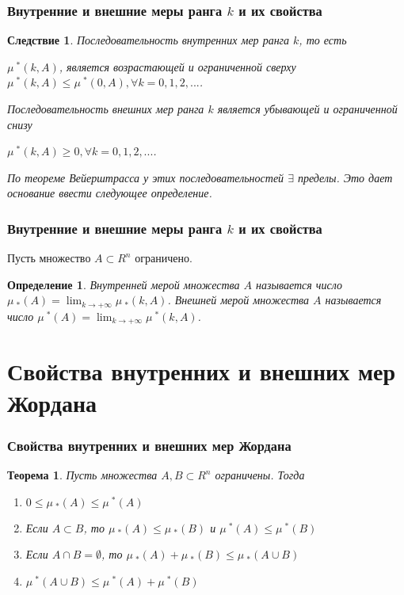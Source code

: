 \documentclass{beamer}
\newtheorem{ru_theo}{Теорема}
\renewenvironment{theorem}{\begin{ru_theo}}{\end{ru_theo}}
\newtheorem{ru_cor}{Следствие}
\renewenvironment{corollary}{\begin{ru_cor}}{\end{ru_cor}}
\newtheorem{ru_def}{Определение}
\renewenvironment{definition}{\begin{ru_def}}{\end{ru_def}}
\begin{document}
\begin{frame}
\frametitle{Внутренние и внешние меры ранга $k$ и их свойства}
	\begin{corollary}
	Последовательность внутренних мер ранга $k$, то есть
	\begin{center} 
	$\mu\ ^* (k, A)$, является возрастающей и ограниченной сверху  $\mu\ ^* (k, A) \leq \mu\ ^*(0, A), \forall k = 0, 1, 2, ...$.
	\end{center}
	 Последовательность внешних мер ранга $k$ является убывающей и ограниченной снизу 
	\begin{center}$\mu\ ^*(k, A) \geq 0, \forall k = 0, 1, 2, ...$.
	\end{center} 
	По теореме Вейерштрасса у этих последовательностей $\exists$  пределы. Это дает основание ввести следующее определение.
	\end{corollary}
\end{frame}

\begin{frame}
\frametitle{Внутренние и внешние меры ранга $k$ и их свойства}
	Пусть множество $A \subset R^n$ ограничено. 
	\begin{definition}
	\textit{Внутренней мерой множества $A$} называется число $\mu\ _*(A) = \lim_{k \to +\infty} \mu\ _*(k, A)$. \textit{Внешней мерой множества $A$} называется число $\mu\ ^*(A) = \lim_{k \to +\infty} \mu\ ^*(k, A)$.
	\end{definition}
\end{frame}

\section{Свойства внутренних и внешних мер Жордана}

\begin{frame}
\frametitle{Свойства внутренних и внешних мер Жордана}
	\begin{theorem}
	Пусть множества $A, B \subset R^n$ ограничены. Тогда
	\begin{enumerate}
	\item $0 \leq \mu\ _*(A) \leq \mu\ ^*(A)$
	\item Если $A \subset B$, то $\mu\ _*(A) \leq \mu\ _*(B)$ и $\mu\ ^*(A) \leq \mu\ ^*(B)$
	\item Если $A \cap B = \emptyset$, то $\mu\ _*(A) + \mu\ _*(B) \leq \mu\ _*(A \cup B)$
	\item $\mu\ ^*(A \cup B) \leq \mu\ ^*(A) + \mu\ ^*(B)$
	\end{enumerate}
	\end{theorem}
\end{frame}
\end{document}

